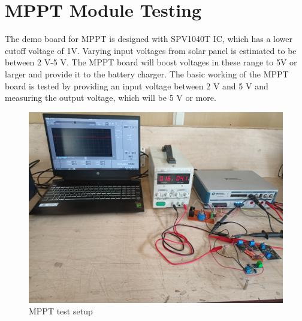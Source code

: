 \section{MPPT Module Testing}
The demo board for MPPT is designed with SPV1040T IC, which has a lower cutoff voltage of 1V. Varying input voltages from solar panel is estimated to be between 2 V-5 V. The MPPT board will boost voltages in these range to 5V or larger and provide it to the battery charger. The basic working of the MPPT board is tested by providing an input voltage between 2 V and 5 V and measuring the output voltage, which will be 5 V or more.
\begin{figure}[H]
	\centering
	\includegraphics[width=0.7\columnwidth]{IMGS/TestSetupPics/TESTPIC_MPPT_MODULE.jpg}
	\caption{MPPT test setup}
	\label{fig:arch}
\end{figure}

